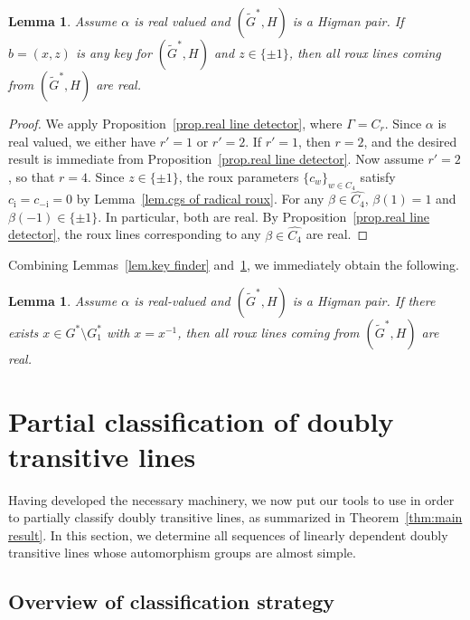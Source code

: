 \documentclass[11pt]{article}
\newtheorem{lemma}[theo]{Lemma}
\theoremstyle{definition}
\numberwithin{equation}{section}
\begin{document}
\begin{lemma}
\label{lem.real radical Higman lines}
Assume $\alpha$ is real valued and $(\widetilde{G}^*,H)$ is a Higman pair.
If $b=(x,z)$ is any key for $(\widetilde{G}^*,H)$ and $z \in \{\pm1\}$, then all roux lines coming from $(\widetilde{G}^*,H)$ are real.
\end{lemma}

\begin{proof}
We apply Proposition~\ref{prop.real line detector}, where $\Gamma = C_r$.
Since $\alpha$ is real valued, we either have $r' = 1$ or $r'=2$.
If $r'=1$, then $r=2$, and the desired result is immediate from Proposition~\ref{prop.real line detector}.
Now assume $r'=2$, so that $r=4$.
Since $z \in \{ \pm 1 \}$, the roux parameters $\{ c_w \}_{w \in C_4}$ satisfy $c_{\mathrm{i}} = c_{-\mathrm{i}} = 0$ by Lemma~\ref{lem.cgs of radical roux}.
For any $\beta \in \widehat{C_4}$, $\beta(1) = 1$ and $\beta(-1) \in \{ \pm 1 \}$.
In particular, both are real.
By Proposition~\ref{prop.real line detector}, the roux lines corresponding to any $\beta \in \widehat{C_4}$ are real.
\end{proof}

Combining Lemmas~\ref{lem.key finder} and~\ref{lem.real radical Higman lines}, we immediately obtain the following.

\begin{lemma}
\label{lem:real involution}
Assume $\alpha$ is real-valued and $(\widetilde{G}^*,H)$ is a Higman pair.
If there exists $x \in G^* \setminus G_1^*$ with $x = x^{-1}$, then all roux lines coming from $(\widetilde{G}^*,H)$ are real.
\end{lemma}






\section{Partial classification of doubly transitive lines}

Having developed the necessary machinery, we now put our tools to use in order to partially classify doubly transitive lines, as summarized in Theorem~\ref{thm:main result}.
In this section, we determine all sequences of linearly dependent doubly transitive lines whose automorphism groups are almost simple.

\subsection{Overview of classification strategy}
\end{document}
